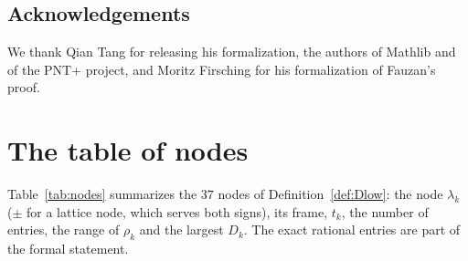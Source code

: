 \documentclass[11pt]{amsart}
\theoremstyle{definition}
\theoremstyle{remark}
\numberwithin{equation}{section}
\begin{document}
\subsection*{Acknowledgements}
We thank Qian Tang for releasing his formalization, the authors of Mathlib and of the PNT+ project, and Moritz
Firsching for his formalization of Fauzan's proof.

\appendix
\section{The table of nodes}\label{app:table}

Table~\ref{tab:nodes} summarizes the $37$ nodes of Definition~\ref{def:Dlow}: the node $\lambda_k$ ($\pm$ for a
lattice node, which serves both signs), its frame, $t_k$, the number of entries, the range of $\rho_k$ and the largest
$D_k$. The exact rational entries are part of the formal statement.
\end{document}
